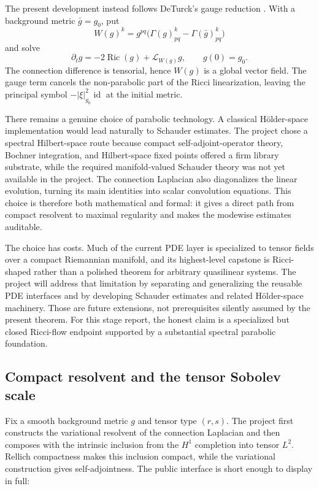 \documentclass[11pt]{article}
\theoremstyle{plain}
\theoremstyle{definition}
\theoremstyle{remark}
\newcommand{\Ric}{\operatorname{Ric}}
\newcommand{\Lie}{\mathcal L}
\begin{document}
The present development instead follows DeTurck's gauge reduction
\cite{MR697987,DeTurck2003}.  With a background metric $\bar g=g_0$, put
\[
  W(g)^k=g^{pq}\bigl(\Gamma(g)^k_{pq}-\Gamma(\bar g)^k_{pq}\bigr)
\]
and solve
\begin{equation}
  \partial_tg=-2\Ric(g)+\Lie_{W(g)}g,
  \qquad g(0)=g_0.
  \label{eq:ricci-deturck-short-time}
\end{equation}
The connection difference is tensorial, hence $W(g)$ is a global vector
field.  The gauge term cancels the non-parabolic part of the Ricci
linearization, leaving the principal symbol
$-\lvert\xi\rvert_{g_0}^2\operatorname{id}$ at the initial metric.

There remains a genuine choice of parabolic technology.  A classical
H\"older-space implementation would lead naturally to Schauder estimates.
The project chose a spectral Hilbert-space route because compact
self-adjoint-operator theory, Bochner integration, and Hilbert-space fixed
points offered a firm library substrate, while the required manifold-valued
Schauder theory was not yet available in the project.  The connection
Laplacian also diagonalizes the linear evolution, turning its main identities
into scalar convolution equations.  This choice is therefore both
mathematical and formal: it gives a direct path from compact resolvent to
maximal regularity and makes the modewise estimates auditable.

The choice has costs.  Much of the current PDE layer is specialized to tensor
fields over a compact Riemannian manifold, and its highest-level capstone is
Ricci-shaped rather than a polished theorem for arbitrary quasilinear systems.
The project will address that limitation by separating and generalizing the
reusable PDE interfaces and by developing Schauder estimates and related
H\"older-space machinery.  Those are future extensions, not prerequisites
silently assumed by the present theorem.  For this stage report, the honest
claim is a specialized but closed Ricci-flow endpoint supported by a
substantial spectral parabolic foundation.

\subsection{Compact resolvent and the tensor Sobolev scale}
\label{subsec:short-time-spectral-foundation}

Fix a smooth background metric $g$ and tensor type $(r,s)$.  The project first
constructs the variational resolvent of the connection Laplacian and then
composes with the intrinsic inclusion from the $H^1$ completion into tensor
$L^2$.  Rellich compactness makes this inclusion compact, while the
variational construction gives self-adjointness.  The public interface is
short enough to display in full:
\end{document}
